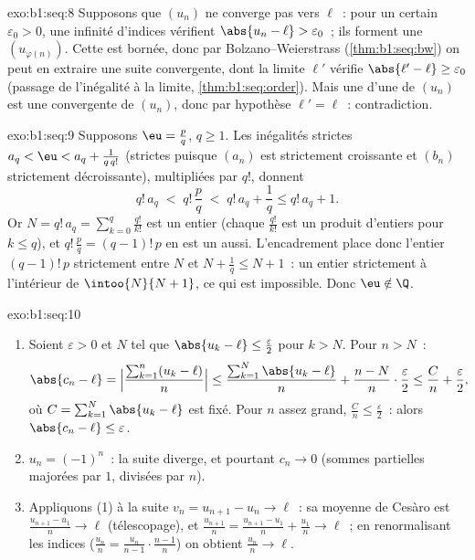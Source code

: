 \begin{solution}{exo:b1:seq:8}
Supposons que $(u_n)$ ne converge pas vers $\ell$~: pour un certain
$\varepsilon_0 > 0$, une infinité d'indices vérifient $\abs{u_n -
\ell} > \varepsilon_0$~; ils forment une 
$(u_{\varphi(n)})$. Cette  est bornée, donc par
Bolzano--Weierstrass (\cref{thm:b1:seq:bw}) on peut en extraire une
suite convergente, dont la limite $\ell'$ vérifie $\abs{\ell' - \ell}
\geq \varepsilon_0$ (passage de l'inégalité à la limite,
\cref{thm:b1:seq:order}). Mais une  d'une 
de $(u_n)$ est une  convergente de $(u_n)$, donc par
hypothèse $\ell' = \ell$~: contradiction.
\end{solution}

\begin{solution}{exo:b1:seq:9}
Supposons $\eu = \frac pq$, $q \geq 1$. Les inégalités strictes $a_q <
\eu < a_q + \frac{1}{q\,q!}$ (strictes puisque $(a_n)$ est strictement
croissante et $(b_n)$ strictement décroissante), multipliées par $q!$,
donnent
\[
q!\,a_q \;<\; q!\,\frac pq \;<\; q!\,a_q + \frac 1q \leq q!\,a_q + 1.
\]
Or $N = q!\,a_q = \sum_{k=0}^{q} \frac{q!}{k!}$ est un entier (chaque
$\frac{q!}{k!}$ est un produit d'entiers pour $k \leq q$), et $q!\,
\frac pq = (q-1)!\,p$ en est un aussi. L'encadrement place donc
l'entier $(q-1)!\,p$ strictement entre $N$ et $N + \frac 1q \leq N +
1$~: un entier strictement à l'intérieur de $\intoo{N}{N+1}$, ce qui
est impossible. Donc $\eu \notin \Q$.
\end{solution}

\begin{solution}{exo:b1:seq:10}
\begin{enumerate}
  \item Soient $\varepsilon > 0$ et $N$ tel que $\abs{u_k - \ell} \leq
        \frac{\varepsilon}{2}$ pour $k > N$. Pour $n > N$~:
        \[
        \abs{c_n - \ell}
        = \Bigl|\frac{\sum_{k=1}^{n}(u_k - \ell)}{n}\Bigr|
        \leq \frac{\sum_{k=1}^{N} \abs{u_k - \ell}}{n}
        + \frac{n - N}{n}\cdot\frac{\varepsilon}{2}
        \leq \frac{C}{n} + \frac{\varepsilon}{2},
        \]
        où $C = \sum_{k=1}^N \abs{u_k - \ell}$ est fixé. Pour $n$
        assez grand, $\frac Cn \leq \frac\varepsilon2$~: alors
        $\abs{c_n - \ell} \leq \varepsilon$.
  \item $u_n = (-1)^n$~: la suite diverge, et pourtant $c_n \to 0$
        (sommes partielles majorées par $1$, divisées par $n$).
  \item Appliquons (1) à la suite $v_n = u_{n+1} - u_n \to \ell$~: sa
        moyenne de Cesàro est $\frac{u_{n+1} - u_1}{n} \to \ell$
        (télescopage), et $\frac{u_{n+1}}{n} = \frac{u_{n+1} -
        u_1}{n} + \frac{u_1}{n} \to \ell$~; en renormalisant les
        indices ($\frac{u_n}{n} = \frac{u_n}{n-1}\cdot\frac{n-1}{n}$)
        on obtient $\frac{u_n}{n} \to \ell$.
\end{enumerate}
\end{solution}

